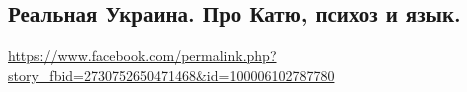 
 
 
 
 

\subsection{Реальная Украина. Про Катю, психоз и язык.}
\url{https://www.facebook.com/permalink.php?story_fbid=2730752650471468&id=100006102787780}

